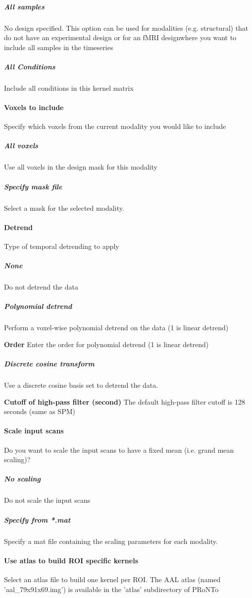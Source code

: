 \subparagraph{All samples}
No design specified. This option can be used for modalities (e.g. structural) that do not have an experimental design or for an fMRI designwhere you want to include all samples in the timeseries


\subparagraph{All Conditions}
Include all conditions in this kernel matrix


\paragraph{Voxels to include}
Specify which voxels from the current modality you would like to include


\subparagraph{All voxels}
Use all voxels in the design mask for this modality


\subparagraph{Specify mask file}
Select a mask for the selected modality.


\paragraph{Detrend}
Type of temporal detrending to apply


\subparagraph{None}
Do not detrend the data 


\subparagraph{Polynomial detrend }
Perform a voxel-wise polynomial detrend on the data (1 is linear detrend) 


\textbf{Order}
Enter the order for polynomial detrend (1 is linear detrend)


\subparagraph{Discrete cosine transform}
Use a discrete cosine basis set to detrend the data.


\textbf{Cutoff of high-pass filter (second)}
The default high-pass filter cutoff is 128 seconds (same as SPM)


\paragraph{Scale input scans}
Do you want to scale the input scans to have a fixed mean (i.e. grand mean scaling)?


\subparagraph{No scaling}
Do not scale the input scans


\subparagraph{Specify from *.mat}
Specify a mat file containing the scaling parameters for each modality.


\paragraph{Use atlas to build ROI specific kernels}
Select an atlas file to build one kernel per ROI. The AAL atlas (named 'aal\_79x91x69.img') is available in the 'atlas' subdirectory of PRoNTo



